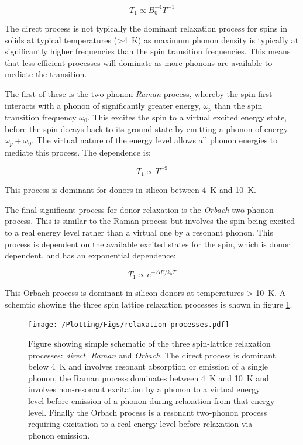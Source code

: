 \begin{equation}
  T_1 \propto B_0^{-4}T^{-1}
\end{equation}

The direct process is not typically the dominant relaxation process for spins in solids at typical temperatures (>4~K) as maximum phonon density is typically at significantly higher frequencies than the spin transition frequencies. This means that less efficient processes will dominate as more phonons are available to mediate the transition.

The first of these is the two-phonon \emph{Raman} process, whereby the spin first interacts with a phonon of significantly greater energy, $\omega_p$ than the spin transition frequency $\omega_0$. This excites the spin to a virtual excited energy state, before the spin decays back to its ground state by emitting a phonon of energy $\omega_p + \omega_0$. The virtual nature of the energy level allows all phonon energies to mediate this process. The dependence is:

\begin{equation}
  T_1 \propto T^{-9}
\end{equation}

This process is dominant for donors in silicon between 4~K and 10~K.

The final significant process for donor relaxation is the \emph{Orbach} two-phonon process. This is similar to the Raman process but involves the spin being excited to a real energy level rather than a virtual one by a resonant phonon. This process is dependent on the available excited states for the spin, which is donor dependent, and has an exponential dependence:

\begin{equation}
  T_1 \propto e^{-\Delta E / k_b T}
\end{equation}

This Orbach process is dominant in silicon donors at temperatures > 10~K. A schemtic showing the three spin lattice relaxation processes is shown in figure \ref{fig:relaxationprocs}.

\begin{figure}
  \centering
  \texttt{[image: /Plotting/Figs/relaxation-processes.pdf]}
  \caption[Relaxation processes]{Figure showing simple schematic of the three spin-lattice relaxation processes: \emph{direct, Raman} and \emph{Orbach}. The direct process is dominant below 4~K and involves resonant absorption or emission of a single phonon, the Raman process dominates between 4~K and 10~K and involves non-resonant excitation by a phonon to a virtual energy level before emission of a phonon during relaxation from that energy level. Finally the Orbach process is a resonant two-phonon process requiring excitation to a real energy level before relaxation via phonon emission.}
  \label{fig:relaxationprocs}
\end{figure}

